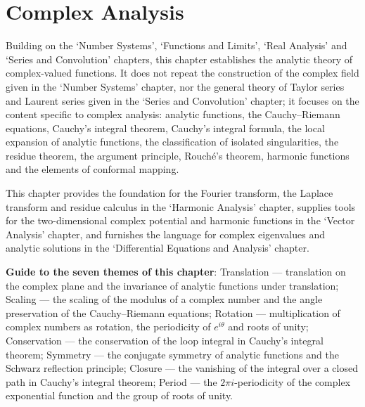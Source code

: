 \chapter{Complex Analysis}
\label{chap:complex_analysis}

\begin{remark}\label{rem:complex_analysis_positioning}
Building on the `Number Systems', `Functions and Limits', `Real Analysis' and `Series and Convolution' chapters, this chapter establishes the analytic theory of complex-valued functions. It does not repeat the construction of the complex field given in the `Number Systems' chapter, nor the general theory of Taylor series and Laurent series given in the `Series and Convolution' chapter; it focuses on the content specific to complex analysis: analytic functions, the Cauchy--Riemann equations, Cauchy's integral theorem, Cauchy's integral formula, the local expansion of analytic functions, the classification of isolated singularities, the residue theorem, the argument principle, Rouché's theorem, harmonic functions and the elements of conformal mapping.

This chapter provides the foundation for the Fourier transform, the Laplace transform and residue calculus in the `Harmonic Analysis' chapter, supplies tools for the two-dimensional complex potential and harmonic functions in the `Vector Analysis' chapter, and furnishes the language for complex eigenvalues and analytic solutions in the `Differential Equations and Analysis' chapter.

\textbf{Guide to the seven themes of this chapter}: Translation --- translation on the complex plane and the invariance of analytic functions under translation; Scaling --- the scaling of the modulus of a complex number and the angle preservation of the Cauchy--Riemann equations; Rotation --- multiplication of complex numbers as rotation, the periodicity of $e^{i\theta}$ and roots of unity; Conservation --- the conservation of the loop integral in Cauchy's integral theorem; Symmetry --- the conjugate symmetry of analytic functions and the Schwarz reflection principle; Closure --- the vanishing of the integral over a closed path in Cauchy's integral theorem; Period --- the $2\pi i$-periodicity of the complex exponential function and the group of roots of unity.


\end{remark}
